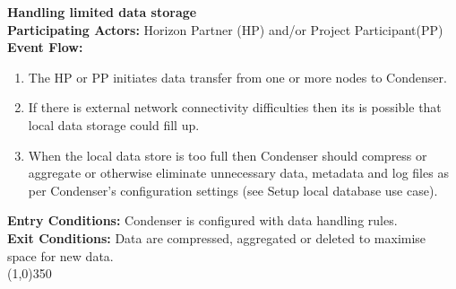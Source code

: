 		\textbf{Handling limited data storage} \\
		\textbf{Participating Actors:} Horizon Partner (HP) and/or Project Participant(PP) \\
		\textbf{Event Flow:}
		\begin{enumerate}
\item The HP or PP initiates data transfer from one or more nodes to Condenser.
\item If there is external network connectivity difficulties then its is possible that local data storage could fill up.
\item When the local data store is too full then Condenser should compress or aggregate or otherwise eliminate unnecessary data, metadata and log files as per Condenser's configuration settings (see Setup local database use case).
	    \end{enumerate}
		\textbf{Entry Conditions:} Condenser is configured with data handling rules.\\
		\textbf{Exit Conditions:} Data are compressed, aggregated or deleted to maximise space for new data.\\
		\line(1,0){350}	